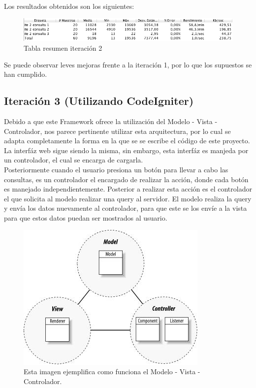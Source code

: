 Los resultados obtenidos son los siguientes:

\begin{figure}[htb]
	\label{Figura10}
	\begin{center}
		\includegraphics[scale=0.6]{imagenes/ite2.png}
		\caption{Tabla resumen iteración 2}
	\end{center}
\end{figure}

Se puede observar leves mejoras frente a la iteración 1, por lo que los supuestos se han cumplido.


\subsection{Iteración 3 (Utilizando CodeIgniter)}

Debido a que este Framework ofrece la utilización del Modelo - Vista - Controlador, nos parece pertinente utilizar esta arquitectura, por lo cual se adapta completamente la forma en la que se se escribe el código de este proyecto. \\

La interfáz web sigue siendo la misma, sin embargo, esta interfáz es manjeda por un controlador, el cual se encarga de cargarla.\\

Posteriormente cuando el usuario presiona un botón para llevar a cabo las consultas, es un controlador el encargado de realizar la acción, donde cada botón es manejado independientemente. Posterior a realizar esta acción es el controlador el que solicita al modelo realizar una query al servidor. El modelo realiza la query y envía los datos nuevamente al controlador, para que este se los envíe a la vista para que estos datos puedan ser mostrados al usuario. 

 \begin{figure}[htb]
 	\label{Figura9}
 	\begin{center}
 		\includegraphics[scale=0.5]{imagenes/mvc.JPG}
 		\caption{Esta imagen ejemplifica como funciona el Modelo - Vista - Controlador.}
 	\end{center}
 \end{figure}
 
